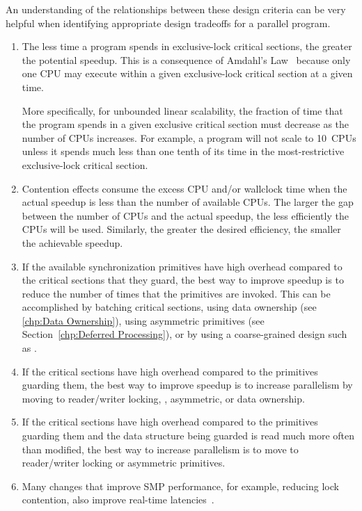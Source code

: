An understanding of the relationships between these design criteria can
be very helpful when identifying appropriate design tradeoffs for a
parallel program.
\begin{enumerate}
\item	The less time a program spends in exclusive-lock critical sections,
	the greater the potential speedup.
	This is a consequence of Amdahl's Law~\cite{GeneAmdahl1967AmdahlsLaw}
	because only one CPU may execute within a given
	exclusive-lock critical section at a given time.

	More specifically, for unbounded linear scalability, the fraction
	of time that the program spends in a given exclusive critical
	section must decrease as the number of CPUs increases.
	For example, a program will not scale to 10~CPUs
	unless it spends much less than one tenth of its time in the
	most-restrictive exclusive-lock critical section.
\item	Contention effects consume the excess CPU and/or
	wallclock time when the actual speedup is less than
	the number of available CPUs.  The
	larger the gap between the number of CPUs
	and the actual speedup, the less efficiently the
	CPUs will be used.
	Similarly, the greater the desired efficiency, the smaller
	the achievable speedup.
\item	If the available synchronization primitives have
	high overhead compared to the critical sections
	that they guard, the best way to improve speedup
	is to reduce the number of times that the primitives
	are invoked.
	This can be accomplished by batching critical sections,
	using data ownership (see \cref{chp:Data Ownership}),
	using asymmetric primitives
	(see Section~\ref{chp:Deferred Processing}),
	or by using a coarse-grained design such as .
\item	If the critical sections have high overhead compared
	to the primitives guarding them, the best way
	to improve speedup is to increase parallelism
	by moving to reader/writer locking, , asymmetric,
	or data ownership.
\item	If the critical sections have high overhead compared
	to the primitives guarding them and the data structure
	being guarded is read much more often than modified,
	the best way to increase parallelism is to move
	to reader/writer locking or asymmetric primitives.
\item	Many changes that improve SMP performance, for example,
	reducing lock contention, also improve real-time
	latencies~\cite{PaulMcKenney2005h}.
\end{enumerate}

